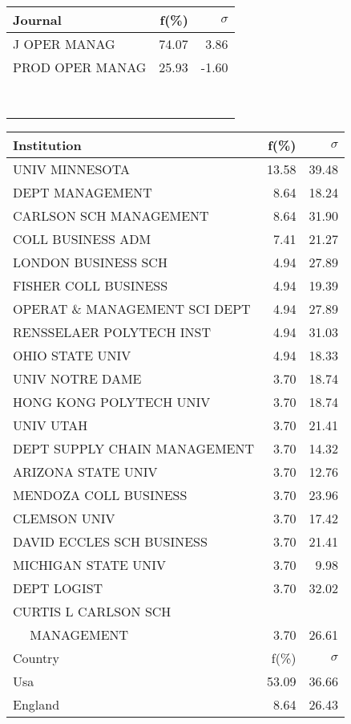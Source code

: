 \documentclass[a4paper,11pt]{report}
\begin{document}
\begin{landscape}
\begin{table}[!ht]
{\begin{tabular}{|l r r|}
Journal & f(\%) & $\sigma$\\
\hline
J OPER MANAG & 74.07 & 3.86\\
PROD OPER MANAG & 25.93 & -1.60\\
 &  & \\
 &  & \\
 &  & \\
 &  & \\
 &  & \\
 &  & \\
 &  & \\
 &  & \\
\hline
\end{tabular}
}
{\scriptsize\begin{tabular}{|l r r|}
\hline
Institution & f(\%) & $\sigma$\\
\hline
UNIV MINNESOTA & 13.58 & 39.48\\
DEPT MANAGEMENT & 8.64 & 18.24\\
CARLSON SCH MANAGEMENT & 8.64 & 31.90\\
COLL BUSINESS ADM & 7.41 & 21.27\\
LONDON BUSINESS SCH & 4.94 & 27.89\\
FISHER COLL BUSINESS & 4.94 & 19.39\\
OPERAT \& MANAGEMENT SCI DEPT & 4.94 & 27.89\\
RENSSELAER POLYTECH INST & 4.94 & 31.03\\
OHIO STATE UNIV & 4.94 & 18.33\\
UNIV NOTRE DAME & 3.70 & 18.74\\
HONG KONG POLYTECH UNIV & 3.70 & 18.74\\
UNIV UTAH & 3.70 & 21.41\\
DEPT SUPPLY CHAIN MANAGEMENT & 3.70 & 14.32\\
ARIZONA STATE UNIV & 3.70 & 12.76\\
MENDOZA COLL BUSINESS & 3.70 & 23.96\\
CLEMSON UNIV & 3.70 & 17.42\\
DAVID ECCLES SCH BUSINESS & 3.70 & 21.41\\
MICHIGAN STATE UNIV & 3.70 & 9.98\\
DEPT LOGIST & 3.70 & 32.02\\
CURTIS L CARLSON SCH &  & \\
$\quad$ MANAGEMENT & 3.70 & 26.61\\
\hline
\hline
Country & f(\%) & $\sigma$\\
\hline
Usa & 53.09 & 36.66\\
England & 8.64 & 26.43\\

\end{tabular}}
\end{table}
\end{landscape}
\end{document}

